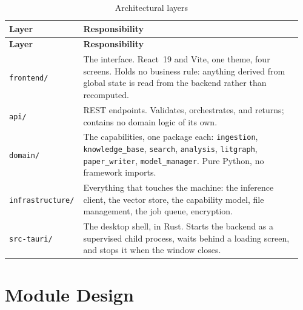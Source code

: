 \documentclass[12pt,a4paper]{report}
\begin{document}
\begin{longtable}{@{}p{0.22\linewidth}p{0.74\linewidth}@{}}
\caption{Architectural layers}\label{tab:layers}\\
\toprule
\textbf{Layer} & \textbf{Responsibility} \\
\midrule
\endfirsthead
\toprule
\textbf{Layer} & \textbf{Responsibility} \\
\midrule
\endhead

\texttt{frontend/} & The interface. React~19 and Vite, one theme, four screens.
  Holds no business rule: anything derived from global state is read from the
  backend rather than recomputed. \\
\addlinespace
\texttt{api/} & REST endpoints. Validates, orchestrates, and returns; contains
  no domain logic of its own. \\
\addlinespace
\texttt{domain/} & The capabilities, one package each: \texttt{ingestion},
  \texttt{knowledge\_base}, \texttt{search}, \texttt{analysis},
  \texttt{litgraph}, \texttt{paper\_writer}, \texttt{model\_manager}. Pure
  Python, no framework imports. \\
\addlinespace
\texttt{infrastructure/} & Everything that touches the machine: the inference
  client, the vector store, the capability model, file management, the job
  queue, encryption. \\
\addlinespace
\texttt{src-tauri/} & The desktop shell, in Rust. Starts the backend as a
  supervised child process, waits behind a loading screen, and stops it when
  the window closes. \\
\bottomrule
\end{longtable}


\section{Module Design}
\end{document}
